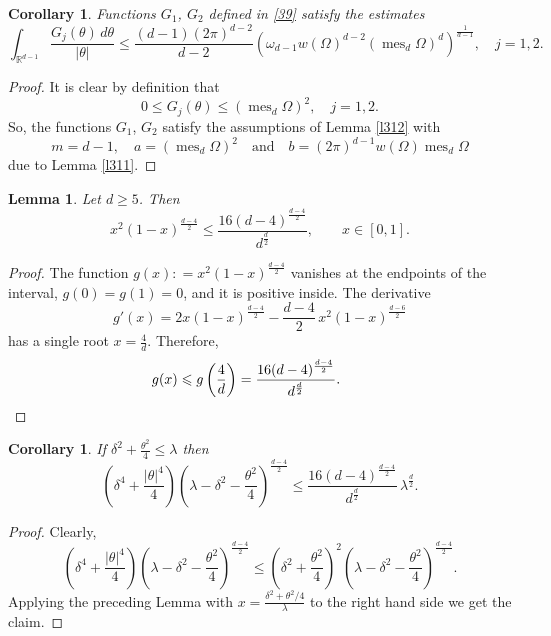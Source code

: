 \documentclass[a4paper,12pt]{article}
\numberwithin{equation}{section}
\def \de{\delta}
\def \la{\lambda}
\def \te{\theta}
\def \oo{\omega}
\def \O{\Omega}
\def \R{\mathbb{R}}
\def\mes{\operatorname{mes}}
\newcommand{\<}{\langle}
\renewcommand{\>}{\rangle}
\theoremstyle{plain}
\newtheorem{lemma}[theorem]{\bf Lemma}
\newtheorem{cor}[theorem]{\bf Corollary}
\theoremstyle{definition}
\theoremstyle{remark}
\renewcommand{\le}{\leqslant}
\renewcommand{\ge}{\geqslant}
\begin{document}
\begin{cor}
\label{c314}
Functions $G_1$, $G_2$ defined in \eqref{39} satisfy the estimates
$$
\int_{\R^{d-1}} \frac{G_j(\te)\, d\te}{|\te|} \le 
\frac{(d-1) (2\pi)^{d-2}}{d-2} 
\left(\oo_{d-1} w(\O)^{d-2} \left(\mes_d\O\right)^d\right)^{\frac1{d-1}},
\quad j = 1, 2.
$$
\end{cor}

\begin{proof}
It is clear by definition that
$$
0 \le G_j (\te) \le (\mes_d\O)^2, \quad j = 1, 2.
$$
So, the functions $G_1$, $G_2$ satisfy the assumptions of Lemma \ref{l312}
with 
$$
m=d-1, \quad a = (\mes_d\O)^2 \quad \text{and}
\quad b =  (2\pi)^{d-1} w(\O) \mes_d \O
$$ 
due to Lemma \ref{l311}.
\end{proof}

\begin{lemma}
\label{l315}
Let $d\ge 5$.
Then
$$
x^2 (1-x)^{\frac{d-4}2} \le \frac{16 (d-4)^{\frac{d-4}2}}{d^{\frac{d}2}},
\qquad x \in [0,1].
$$
\end{lemma}

\begin{proof}
The function
$g(x): = x^2 (1-x)^{\frac{d-4}2}$
vanishes at the endpoints of the interval,
$g(0) = g(1) = 0$,
and it is positive inside.
The derivative
$$
g'(x) = 2x (1-x)^{\frac{d-4}2} - \frac{d-4}2\, x^2 (1-x)^{\frac{d-6}2}
$$
has a single root $x = \frac4d$.
Therefore,
$$
g(x) \le g\left(\frac4d\right) = \frac{16 (d-4)^{\frac{d-4}2}}{d^{\frac{d}2}}.
\qquad \qedhere
$$
\end{proof}

\begin{cor}
\label{c316}
If $\de^2 + \frac{\te^2}4 \le \la$ then
$$
\left(\de^4 + \frac{|\te|^4}4\right) \left(\la - \de^2 - \frac{\te^2}4\right)^{\frac{d-4}2}
\le \frac{16 (d-4)^{\frac{d-4}2}}{d^{\frac{d}2}}\, \la^{\frac{d}2}.
$$
\end{cor}

\begin{proof}
Clearly,
$$
\left(\de^4 + \frac{|\te|^4}4\right) \left(\la - \de^2 - \frac{\te^2}4\right)^{\frac{d-4}2}
\le \left(\de^2 + \frac{\te^2}4\right)^2 \left(\la - \de^2 - \frac{\te^2}4\right)^{\frac{d-4}2}.
$$
Applying the preceding Lemma with 
$x = \frac{\de^2 + \te^2/4}\la$ to the right hand side we get the claim.
\end{proof}
\end{document}
